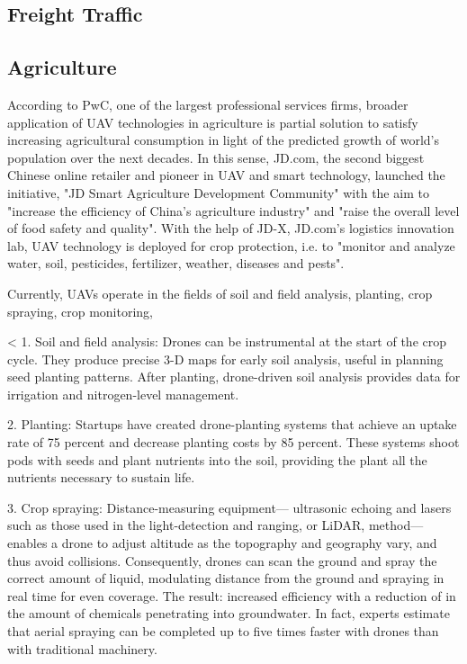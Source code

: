 \subsection{Freight Traffic}

\subsection{Agriculture}

According to PwC, one of the largest professional services firms,
broader application of UAV technologies in agriculture 
is partial solution to satisfy 
increasing agricultural consumption
in light of the predicted growth of world's population
over the next decades.
In this sense, JD.com,
the second biggest Chinese online retailer
and pioneer in UAV and smart technology,
launched the initiative,
"JD Smart Agriculture Development Community"
with the aim to
"increase the efficiency of China’s agriculture industry" and
"raise the overall level of food safety and quality".
With the help of 
JD-X, JD.com’s logistics innovation lab,
UAV technology is deployed for
crop protection, i.e. to 
"monitor and analyze water, soil, pesticides, fertilizer, weather, diseases and pests".




Currently, UAVs operate in
the fields of
soil and field analysis,
planting,
crop spraying,
crop monitoring,




<
1. Soil and field analysis: 
Drones can be instrumental at the start of the crop cycle. 
They produce precise 3-D maps for early soil analysis, 
useful in planning seed planting patterns. 
After planting, drone-driven soil analysis provides data for 
irrigation and nitrogen-level management.

2. Planting: 
Startups have created drone-planting systems 
that achieve an uptake rate of 75 percent and 
decrease planting costs by 85 percent. 
These systems shoot pods with seeds and 
plant nutrients into the soil, 
providing the plant all the nutrients 
necessary to sustain life.

3. Crop spraying: 
Distance-measuring equipment—
ultrasonic echoing and 
lasers such as those used in the light-detection and ranging, 
or LiDAR, method—
enables a drone to adjust altitude 
as the topography and geography vary, and 
thus avoid collisions. 
Consequently, drones can scan the ground and 
spray the correct amount of liquid, 
modulating distance from the ground and 
spraying in real time for even coverage. 
The result: increased efficiency 
with a reduction of in the amount of chemicals 
penetrating into groundwater. 
In fact, experts estimate that aerial spraying 
can be completed up to five times faster with drones 
than with traditional machinery.


